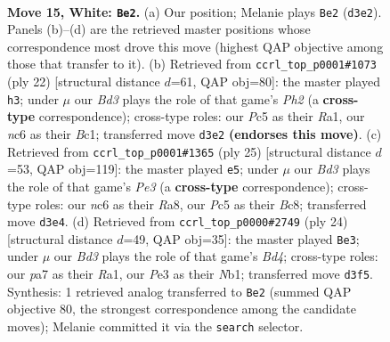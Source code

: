 \documentclass[11pt]{article}
\begin{document}
\clearpage

\begin{figure}[p]\centering
\begin{subfigure}{0.46\textwidth}\centering
\resizebox{\linewidth}{!}{%
\newchessgame
\chessboard[
  setfen={r1bq1rk1/pp3ppp/2n1pn2/2P5/2P5/3BP3/P1N2PPP/1RBQ1RK1 w - - 7 15},
  showmover=false,
  pgfstyle=straightmove, color=movearrow, markmove={d3-e2}
]}
\caption{}
\end{subfigure}\hfill
\begin{subfigure}{0.46\textwidth}\centering
\resizebox{\linewidth}{!}{%
\newchessgame
\chessboard[
  setfen={r1b2rk1/pp2pp1p/2nq1np1/8/2P5/1N1B4/P1P2PPP/R1BQ1RK1 w - - 1 12},
  showmover=false,
  pgfstyle=straightmove, color=movearrow, markmove={h2-h3}
]}
\caption{}
\end{subfigure}
\\[4pt]
\begin{subfigure}{0.46\textwidth}\centering
\resizebox{\linewidth}{!}{%
\newchessgame
\chessboard[
  setfen={r1bq1rk1/pp3ppp/3bpn2/1P6/2B5/4PN2/P4PPP/R1BQ1RK1 b - - 0 13},
  showmover=false,
  pgfstyle=straightmove, color=movearrow, markmove={e6-e5}
]}
\caption{}
\end{subfigure}\hfill
\begin{subfigure}{0.46\textwidth}\centering
\resizebox{\linewidth}{!}{%
\newchessgame
\chessboard[
  setfen={rn3rk1/pp1qbppp/4pn2/8/2PB4/5B1P/PP3PP1/RN1Q1RK1 w - - 1 13},
  showmover=false,
  pgfstyle=straightmove, color=movearrow, markmove={d4-e3}
]}
\caption{}
\end{subfigure}
\caption{\textbf{Move 15, White: \texttt{Be2}.} (a) Our position; Melanie plays \texttt{Be2} (\texttt{d3e2}). Panels (b)--(d) are the retrieved master positions whose correspondence most drove this move (highest QAP objective among those that transfer to it). (b) Retrieved from \texttt{ccrl\_top\_p0001\#1073} (ply 22) [structural distance $d$=61, QAP obj=80]: the master played \texttt{h3}; under $\mu$ our \emph{Bd3} plays the role of that game's \emph{Ph2} (a \textbf{cross-type} correspondence); cross-type roles: our \emph{P}c5 as their \emph{R}a1, our \emph{n}c6 as their \emph{B}c1; transferred move \texttt{d3e2} \textbf{(endorses this move)}. (c) Retrieved from \texttt{ccrl\_top\_p0001\#1365} (ply 25) [structural distance $d$=53, QAP obj=119]: the master played \texttt{e5}; under $\mu$ our \emph{Bd3} plays the role of that game's \emph{Pe3} (a \textbf{cross-type} correspondence); cross-type roles: our \emph{n}c6 as their \emph{R}a8, our \emph{P}c5 as their \emph{B}c8; transferred move \texttt{d3e4}. (d) Retrieved from \texttt{ccrl\_top\_p0000\#2749} (ply 24) [structural distance $d$=49, QAP obj=35]: the master played \texttt{Be3}; under $\mu$ our \emph{Bd3} plays the role of that game's \emph{Bd4}; cross-type roles: our \emph{p}a7 as their \emph{R}a1, our \emph{P}e3 as their \emph{N}b1; transferred move \texttt{d3f5}. Synthesis: 1 retrieved analog transferred to \texttt{Be2} (summed QAP objective 80, the strongest correspondence among the candidate moves); Melanie committed it via the \texttt{search} selector.}
\label{fig:thought-m28}
\end{figure}
\end{document}
